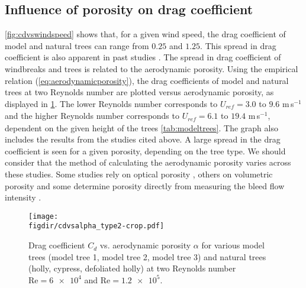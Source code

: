 \subsection{Influence of porosity on drag coefficient}
\label{subsec:porosity}
\cref{fig:cdvswindspeed} shows that, for a given wind speed, the drag coefficient of model and natural trees can range from $0.25$ and $1.25$. This spread in drag coefficient is also apparent in past studies \citep{Bitog2011b,Dong2007,Guan2003,Hagen1971,Rudnicki2004,Vollsinger2005,Wilson1985}. The spread in drag coefficient of windbreaks and trees is related to the aerodynamic porosity. Using the empirical relation (\cref{eq:aerodynamicporosity}), the drag coefficients of model and natural trees at two Reynolds number are plotted versus aerodynamic porosity, as displayed in \cref{fig:cdvsalpha}. The lower Reynolds number corresponds to $U_{\textit{ref}}=3.0$ to $9.6$ m\,s$^{-1}$ and the higher Reynolds number corresponds to $U_{\textit{ref}}=6.1$ to $19.4$ m\,s$^{-1}$, dependent on the given height of the trees \cref{tab:modeltrees}. The graph also includes the results from the studies cited above. A large spread in the drag coefficient is seen for a given porosity, depending on the tree type. We should consider that the method of calculating the aerodynamic porosity varies across these studies. Some studies rely on optical porosity \citep{Dong2008,Guan2003,Hagen1971,Wilson1985}, others on volumetric porosity \citep{Grant1998} and some determine porosity directly from measuring the bleed flow intensity \citep{Bitog2011b}.

	\begin{figure}[t]
	\centering
	\texttt{[image: \\figdir/cdvsalpha\_type2-crop.pdf]}
	\caption{Drag coefficient $C_d$ vs. aerodynamic porosity $\alpha$ for various model trees (model tree 1, model tree 2, model tree 3) and natural trees (holly, cypress, defoliated holly) at two Reynolds number $\mathrm{Re} = \num{6e4}$ and $\mathrm{Re}=\num{1.2e5}$.}
	\label{fig:cdvsalpha}
	\end{figure}

